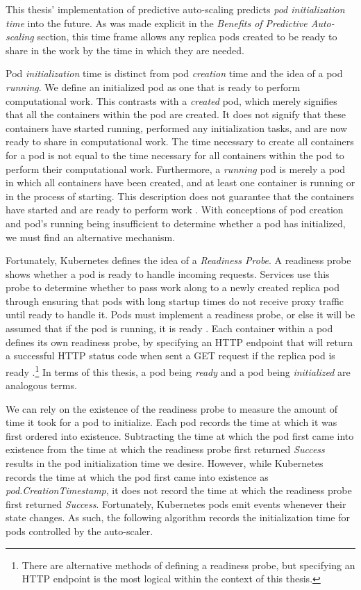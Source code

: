 This thesis' implementation of predictive auto-scaling predicts \textit{pod
initialization time} into the future. As was made explicit in the
\textit{Benefits of Predictive Auto-scaling} section, this time
frame allows any replica pods created to be ready to share in the work by the
time in which they are needed.

Pod \textit{initialization} time is distinct from pod \textit{creation} time and
the idea of a pod \textit{running}. We define an initialized pod as one that is
ready to perform computational work. This contrasts with a \textit{created} pod,
which merely signifies that all the containers within the pod are created. It
does not signify that these containers have started running, performed any
initialization tasks, and are now ready to share in computational work. The time
necessary to create all containers for a pod is not equal to the time necessary
for all containers within the pod to perform their computational work.
Furthermore, a \textit{running} pod is merely a pod in which all containers have
been created, and at least one container is running or in the process of
starting. This description does not guarantee that the containers have started
and are ready to perform work \cite{k8s-pod-states}. With conceptions
of pod creation and pod's
running being insufficient to determine whether a pod has initialized, we must
find an alternative mechanism.

Fortunately, Kubernetes defines the idea of a \textit{Readiness Probe}. A
readiness probe shows whether a pod is ready to handle incoming requests.
Services use this probe to determine whether to pass work along to a newly
created replica pod through ensuring that pods with long startup times do not
receive proxy traffic until ready to handle it. Pods must implement a readiness
probe, or else it will be assumed that if the pod is running, it is ready
\cite{k8s-pod-states}. Each container within a pod defines its own readiness
probe, by specifying an HTTP endpoint that will return a successful HTTP status
code when sent a GET request if the replica pod is ready
\cite{k8s-working-with-containers}.\footnote{There are alternative methods of
defining a readiness probe, but specifying an HTTP endpoint is the most logical
within the context of this thesis.} In terms of this thesis, a
pod being \textit{ready} and a pod being \textit{initialized} are analogous
terms.

We can rely on the existence of the readiness probe to
measure the amount of time it took for a pod
to initialize. Each pod records the time at which it was first ordered into
existence. Subtracting the time at which the pod first came into existence
from the time at which the readiness probe first returned \textit{Success}
results in the pod initialization time we desire. However, while Kubernetes
records the time at which the pod first came into existence as
\textit{pod.CreationTimestamp}, it does not record the time at which the
readiness probe first returned \textit{Success}. Fortunately, Kubernetes pods
emit events whenever their state changes. As such, the following algorithm
records the initialization time for pods controlled by the auto-scaler.

